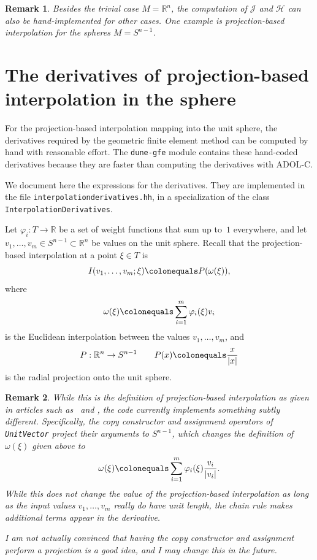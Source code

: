 \documentclass[a4paper]{article}
\newcommand{\cpp}[1]{\lstinline[basicstyle=\ttfamily]!#1!}
\newcommand{\dunemodule}[1]{\texttt{#1}}
\newtheorem{remark}{Remark}
\newcommand{\R}{\mathbb R}
\DeclarePairedDelimiter{\abs}{\lvert}{\rvert}
\begin{document}
\begin{remark}
 Besides the trivial case $M = \R^n$, the computation of $\mathcal J$ and $\mathcal H$
 can also be hand-implemented for other cases.  One example is projection-based
 interpolation for the spheres $M = S^{n-1}$.
\end{remark}


\section{The derivatives of projection-based interpolation in the sphere}

For the projection-based interpolation mapping into the unit sphere, the derivatives
required by the geometric finite element method can be computed by hand
with reasonable effort. The \dunemodule{dune-gfe} module contains these hand-coded
derivatives because they are faster than computing the derivatives with ADOL-C.

We document here the expressions for the derivatives. They are implemented in the file
\texttt{interpolationderivatives.hh}, in a specialization of the class
\cpp{InterpolationDerivatives}.

Let $\varphi_i : T \to \R$ be a set of weight functions that sum up to~$1$
everywhere, and let $v_1,\dots,v_m \in S^{n-1} \subset \R^n$ be values
on the unit sphere.  Recall that the projection-based interpolation at
a point $\xi \in T$ is
\begin{equation*}
 I(v_1,\dots,v_m;\xi)
 \colonequals
 P(\omega(\xi)),
\end{equation*}
where
\begin{equation*}
 \omega(\xi) \colonequals \sum_{i=1}^m \varphi_i(\xi)v_i
\end{equation*}
is the Euclidean interpolation between the values $v_1,\dots,v_m$, and
\begin{equation*}
 P : \R^n \to S^{n-1}
 \qquad
 P(x) \colonequals \frac{x}{\abs{x}}
\end{equation*}
is the radial projection onto the unit sphere.

\begin{remark}
 While this is the definition of projection-based interpolation as given in articles
 such as~\cite{grohs_hardering_sander_sprecher:2019} and \cite{hardering_sander:2020},
 the code currently implements something subtly different.  Specifically, the
 copy constructor and assignment operators of \texttt{UnitVector} project their
 arguments to $S^{n-1}$, which changes the definition of $\omega(\xi)$ given above to
 \begin{equation*}
  \omega(\xi)
  \colonequals
  \sum_{i=1}^m \varphi_i(\xi) \frac{v_i}{\abs{v_i}}.
 \end{equation*}
 While this does not change the value of the projection-based interpolation as long as
 the input values $v_1,\dots,v_m$ really do have unit length, the chain rule makes
 additional terms appear in the derivative.

 I am not actually convinced that having the copy constructor and assignment perform
 a projection is a good idea, and I may change this in the future.
\end{remark}
\end{document}
